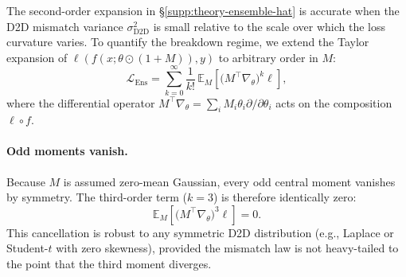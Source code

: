 The second-order expansion in \S\ref{supp:theory-ensemble-hat} is accurate when the D2D mismatch variance $\sigma_{\text{D2D}}^2$ is small relative to the scale over which the loss curvature varies. To quantify the breakdown regime, we extend the Taylor expansion of $\ell(f(x;\theta\odot(1+M)),y)$ to arbitrary order in $M$:
\begin{equation}
    \mathcal{L}_{\text{Ens}} = \sum_{k=0}^{\infty} \frac{1}{k!}\,\mathbb{E}_M\!\left[\bigl(M^{\top}\nabla_{\theta}\bigr)^{k}\ell\right],
    \label{eq:taylor-arbitrary-order}
\end{equation}
where the differential operator $M^{\top}\nabla_{\theta} = \sum_i M_i\theta_i\partial/\partial\theta_i$ acts on the composition $\ell\circ f$.

\paragraph{Odd moments vanish.} Because $M$ is assumed zero-mean Gaussian, every odd central moment vanishes by symmetry. The third-order term ($k=3$) is therefore identically zero:
\begin{equation}
    \mathbb{E}_M\!\left[\bigl(M^{\top}\nabla_{\theta}\bigr)^{3}\ell\right] = 0.
    \label{eq:third-order-zero}
\end{equation}
This cancellation is robust to any symmetric D2D distribution (e.g., Laplace or Student-$t$ with zero skewness), provided the mismatch law is not heavy-tailed to the point that the third moment diverges.


